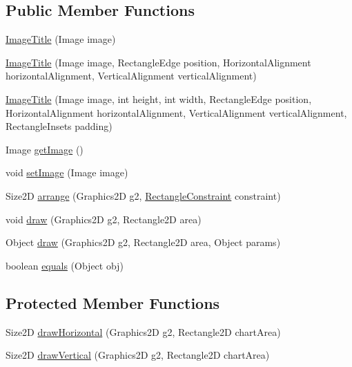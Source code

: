 \subsection*{Public Member Functions}
\begin{DoxyCompactItemize}
\item 
\mbox{\hyperlink{classorg_1_1jfree_1_1chart_1_1title_1_1_image_title_a24e3d2cf74bb93acae77375d4b741351}{Image\+Title}} (Image image)
\item 
\mbox{\hyperlink{classorg_1_1jfree_1_1chart_1_1title_1_1_image_title_a26fb70ce9e60257f6ee46e358e392aff}{Image\+Title}} (Image image, Rectangle\+Edge position, Horizontal\+Alignment horizontal\+Alignment, Vertical\+Alignment vertical\+Alignment)
\item 
\mbox{\hyperlink{classorg_1_1jfree_1_1chart_1_1title_1_1_image_title_a94d45e8836155b69c6a0a921dce14060}{Image\+Title}} (Image image, int height, int width, Rectangle\+Edge position, Horizontal\+Alignment horizontal\+Alignment, Vertical\+Alignment vertical\+Alignment, Rectangle\+Insets padding)
\item 
Image \mbox{\hyperlink{classorg_1_1jfree_1_1chart_1_1title_1_1_image_title_ac14ca8152629076360eb04f0f93eb2ba}{get\+Image}} ()
\item 
void \mbox{\hyperlink{classorg_1_1jfree_1_1chart_1_1title_1_1_image_title_a1293428d9954c155e853daf43127995d}{set\+Image}} (Image image)
\item 
Size2D \mbox{\hyperlink{classorg_1_1jfree_1_1chart_1_1title_1_1_image_title_a6fcab813990b8e21fd307a2e6a7d0475}{arrange}} (Graphics2D g2, \mbox{\hyperlink{classorg_1_1jfree_1_1chart_1_1block_1_1_rectangle_constraint}{Rectangle\+Constraint}} constraint)
\item 
void \mbox{\hyperlink{classorg_1_1jfree_1_1chart_1_1title_1_1_image_title_a799b299251111824381f1b201d95c79d}{draw}} (Graphics2D g2, Rectangle2D area)
\item 
Object \mbox{\hyperlink{classorg_1_1jfree_1_1chart_1_1title_1_1_image_title_af625a9d48781190c5c12f5e6293820ea}{draw}} (Graphics2D g2, Rectangle2D area, Object params)
\item 
boolean \mbox{\hyperlink{classorg_1_1jfree_1_1chart_1_1title_1_1_image_title_a37f9386a7a5f0cb24e36f39aa1211c2a}{equals}} (Object obj)
\end{DoxyCompactItemize}
\subsection*{Protected Member Functions}
\begin{DoxyCompactItemize}
\item 
Size2D \mbox{\hyperlink{classorg_1_1jfree_1_1chart_1_1title_1_1_image_title_a3ca1645a111e8135402cc2cdb933d929}{draw\+Horizontal}} (Graphics2D g2, Rectangle2D chart\+Area)
\item 
Size2D \mbox{\hyperlink{classorg_1_1jfree_1_1chart_1_1title_1_1_image_title_affcbdeb7d1cf30323727a8d555f91b5f}{draw\+Vertical}} (Graphics2D g2, Rectangle2D chart\+Area)
\end{DoxyCompactItemize}
